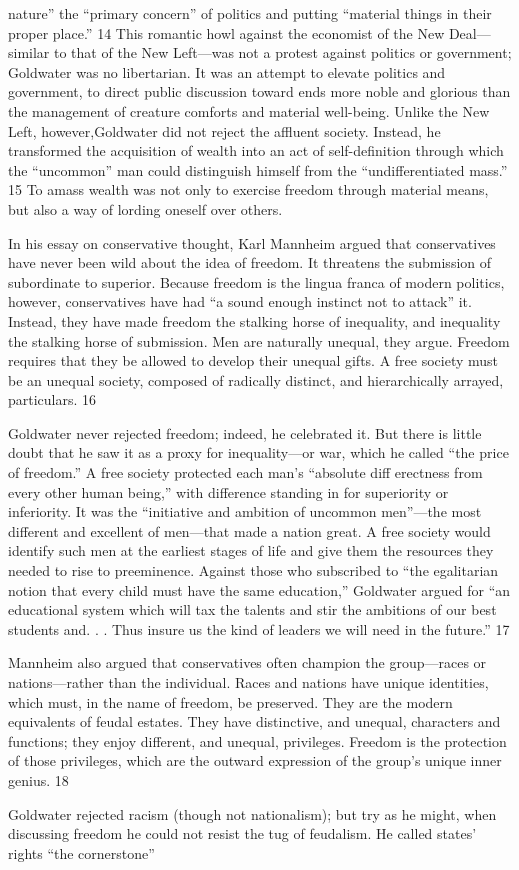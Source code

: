 nature” the “primary concern” of politics and putting “material things in their proper place.” {\color{blue} 14 } This romantic howl against the economist of the New Deal— similar to that of the New Left—was not a protest against politics or government; Goldwater was no libertarian. It was an attempt to elevate politics and government, to direct public discussion toward ends more noble and glorious than the management of creature comforts and material well-being. Unlike the New Left, however,Goldwater did not reject the affluent society. Instead, he transformed the acquisition of wealth into an act of self-definition through which the “uncommon” man could distinguish himself from the “undifferentiated mass.” {\color{blue} 15 } To amass wealth was not only to exercise freedom through material means, but also a way of lording oneself over others.{\par} In his essay on conservative thought, Karl Mannheim argued that conservatives have never been wild about the idea of freedom. It threatens the submission of subordinate to superior. Because freedom is the lingua franca of modern politics, however, conservatives have had “a sound enough instinct not to attack” it. Instead, they have made freedom the stalking horse of inequality, and inequality the stalking horse of submission. Men are naturally unequal, they argue. Freedom requires that they be allowed to develop their unequal gifts. A free society must be an unequal society, composed of radically distinct, and hierarchically arrayed, particulars. {\color{blue} 16 } {\par} Goldwater never rejected freedom; indeed, he celebrated it. But there is little doubt that he saw it as a proxy for inequality—or war, which he called “the price of freedom.” A free society protected each man’s “absolute diff erectness from every other human being,” with difference standing in for superiority or inferiority. It was the “initiative and ambition of uncommon men”—the most different and excellent of men—that made a nation great. A free society would identify such men at the earliest stages of life and give them the resources they needed to rise to preeminence. Against those who subscribed to “the egalitarian notion that every child must have the same education,” Goldwater argued for “an educational system which will tax the talents and stir the ambitions of our best students and. . . Thus insure us the kind of leaders we will need in the future.” {\color{blue} 17 } {\par} Mannheim also argued that conservatives often champion the group—races or nations—rather than the individual. Races and nations have unique identities, which must, in the name of freedom, be preserved. They are the modern equivalents of feudal estates. They have distinctive, and unequal, characters and functions; they enjoy different, and unequal, privileges. Freedom is the protection of those privileges, which are the outward expression of the group’s unique inner genius. {\color{blue} 18 } {\par} Goldwater rejected racism (though not nationalism); but try as he might, when discussing freedom he could not resist the tug of feudalism. He called states’ rights “the cornerstone” 